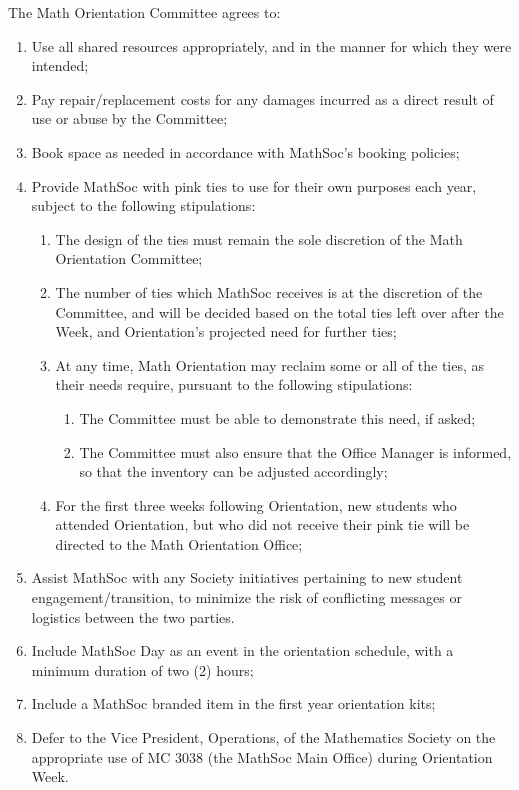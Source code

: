 \documentclass[12pt, letterpaper]{mathsoc}
\begin{document}
The Math Orientation Committee agrees to:
\begin{enumerate}
    \item Use all shared resources appropriately, and in the manner for which they were intended;
    \item Pay repair/replacement costs for any damages incurred as a direct result of use or abuse by the Committee;
    \item Book space as needed in accordance with MathSoc’s booking policies;
    \item Provide MathSoc with pink ties to use for their own purposes each year, subject to the following stipulations:
\begin{enumerate}
    \item The design of the ties must remain the sole discretion of the Math Orientation Committee;
    \item The number of ties which MathSoc receives is at the discretion of the Committee, and will be decided based on the total ties left over after the Week, and Orientation’s projected need for further ties;
    \item At any time, Math Orientation may reclaim some or all of the ties, as their needs require, pursuant to the following stipulations: 
\begin{enumerate}
    \item The Committee must be able to demonstrate this need, if asked;
    \item The Committee must also ensure that the Office Manager is informed, so that the inventory can be adjusted accordingly;
\end{enumerate}
    \item For the first three weeks following Orientation, new students who attended Orientation, but who did not receive their pink tie will be directed to the Math Orientation Office;
\end{enumerate}
    \item Assist MathSoc with any Society initiatives pertaining to new student 
    engagement/transition, to minimize the risk of conflicting messages or 
    logistics between the two parties.
    \item Include MathSoc Day as an event in the orientation schedule, with a minimum duration of two (2) hours;
    \item Include a MathSoc branded item in the first year orientation kits;
    \item Defer to the Vice President, Operations, of the Mathematics Society on the appropriate use of MC 3038 (the MathSoc Main Office) during Orientation Week.
\end{enumerate}
\end{document}
